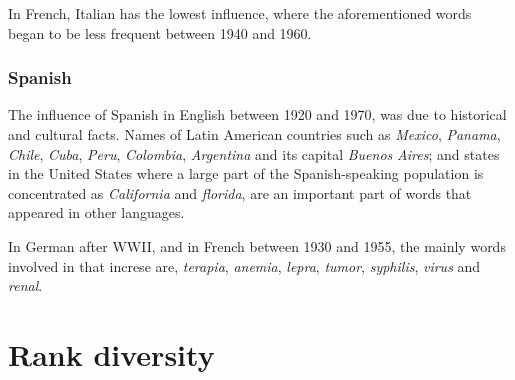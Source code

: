 \documentclass[10pt,letterpaper]{article} %
\begin{document}
In French, Italian has the lowest influence, where the aforementioned words
began to be less frequent between 1940 and 1960.
\subsubsection*{Spanish} %

The influence of Spanish in English between 1920 and 1970, was due to
historical and cultural facts. Names of Latin American  countries such as
\textit{Mexico}, \textit{Panama}, \textit{Chile}, \textit{Cuba}, \textit{Peru},
\textit{Colombia}, \textit{Argentina} and its capital \textit{Buenos}
\textit{Aires};  and states in the United States  where a large part of the
Spanish-speaking population is concentrated as \textit{California} and
\textit{florida}, are an important part of words that appeared in 
other languages. 

In German after WWII, and in French between 1930 and 1955, the mainly words
involved in that increse are, \textit{terapia}, \textit{anemia},
\textit{lepra}, \textit{tumor}, \textit{syphilis}, \textit{virus} and
\textit{renal}. 

\section*{Rank diversity} %
\end{document}
